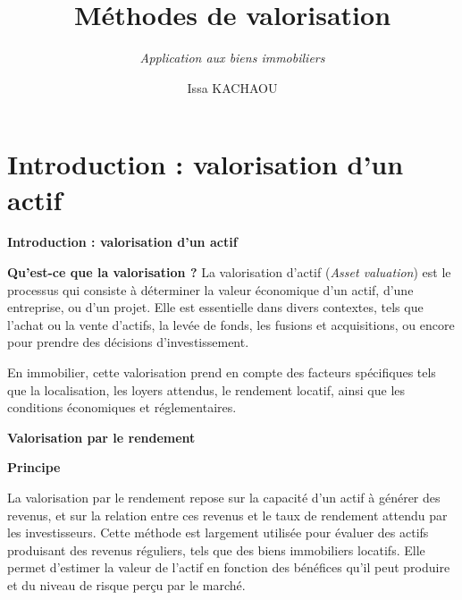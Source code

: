\documentclass{beamer}
\title{Méthodes de valorisation}
\subtitle{\textit{Application aux biens immobiliers}}
\author{Issa KACHAOU}
\begin{document}
	\begin{frame}[plain]
		\maketitle
	\end{frame}

\section{Introduction : valorisation d'un actif}	
	\begin{frame}{\textbf{Introduction : valorisation d'un actif}}
		\begin{block}{\textbf{Qu'est-ce que la valorisation ?}}{}
La valorisation d'actif (\textit{Asset valuation}) est le processus qui consiste à déterminer la valeur économique d’un actif, d’une entreprise, ou d’un projet. Elle est essentielle dans divers contextes, tels que l’achat ou la vente d’actifs, la levée de fonds, les fusions et acquisitions, ou encore pour prendre des décisions d’investissement.
		\end{block}

\begin{block}{}
En immobilier, cette valorisation prend en compte des facteurs spécifiques tels que la localisation, les loyers attendus, le rendement locatif, ainsi que les conditions économiques et réglementaires.
\end{block}



	\end{frame}
	
\begin{frame}{\textbf{Valorisation par le rendement}}


\begin{block}{\textbf{Principe}}
	
La valorisation par le rendement repose sur la capacité d’un actif à générer des revenus, et sur la relation entre ces revenus et le taux de rendement attendu par les investisseurs. Cette méthode est largement utilisée pour évaluer des actifs produisant des revenus réguliers, tels que des biens immobiliers locatifs. Elle permet d’estimer la valeur de l’actif en fonction des bénéfices qu’il peut produire et du niveau de risque perçu par le marché.
	
\end{block}

\end{frame}
\end{document}
